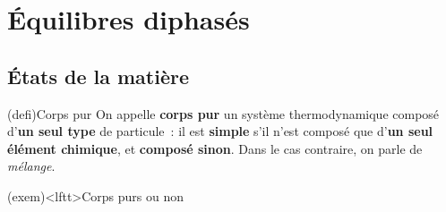 \documentclass[../../main/main.tex]{subfiles}
\begin{document}
\section{Équilibres diphasés}
\subsection{États de la matière}
\begin{tcb*}(defi){Corps pur}
	On appelle \textbf{corps pur} un système thermodynamique composé d'\textbf{un
		seul type} de particule~: il est \textbf{simple} s'il n'est composé que
	d'\textbf{un seul élément chimique}, et \textbf{composé sinon}. Dans le cas
	contraire, on parle de \textit{mélange}.
\end{tcb*}
\begin{tcb}[sidebyside](exem)<lftt>{Corps purs ou non}
	\begin{isd}[cnt]
		\tcblower
	\end{isd}
	\tcblower
	\begin{isd}[cnt]
		\tcblower
	\end{isd}
\end{tcb}
\end{document}
